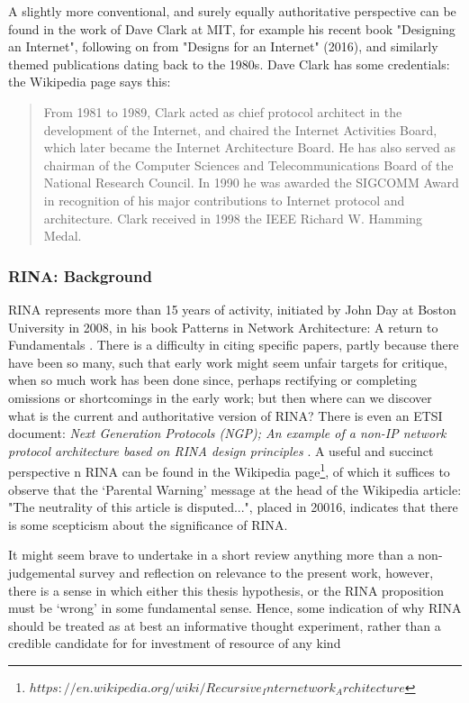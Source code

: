 A slightly more conventional, and surely equally authoritative perspective can be found in the work of Dave Clark at MIT, for example his recent book "Designing an Internet"\cite{clark2023}, following on from "Designs for an Internet" (2016), and similarly themed publications dating back to the 1980s.
Dave Clark has some credentials: the Wikipedia page says this:
\begin{quote}
	From 1981 to 1989, Clark acted as chief protocol architect in the development of the Internet, and chaired the Internet Activities Board, which later became the Internet Architecture Board.
	He has also served as chairman of the Computer Sciences and Telecommunications Board of the National Research Council.
	In 1990 he was awarded the SIGCOMM Award in recognition of his major contributions to Internet protocol and architecture.
	Clark received in 1998 the IEEE Richard W. Hamming Medal.
\end{quote}
\subsubsection{RINA: Background}

RINA represents more than 15 years of activity, initiated by John Day at Boston University in 2008, in his book Patterns in Network Architecture: A return to Fundamentals \cite{rinabook}.  There is a difficulty in citing specific papers, partly because there have been so many, such that early work might seem unfair targets for critique, when so much work has been done since, perhaps rectifying or completing omissions or shortcomings in the early work\cite{day2008}; but then where can we discover what is the current and authoritative version of RINA?  There is even an ETSI document: \textit{Next Generation Protocols (NGP); An example of a non-IP network protocol architecture based on RINA design principles} \cite{etsi-rina}.
A useful and succinct perspective n RINA can be found in the Wikipedia page\footnote{$https://en.wikipedia.org/wiki/Recursive_Internetwork_Architecture$}, of which it suffices to observe that the `Parental Warning' message at the head of the Wikipedia article: "The neutrality of this article is disputed...", placed in 20016, indicates that there is some scepticism about the significance of RINA.

It might seem brave to undertake in a short review anything more than a non-judgemental survey and reflection on relevance to the present work, however, there is a sense in which either this thesis hypothesis, or the RINA proposition must be `wrong' in some fundamental sense.  Hence, some indication of why RINA should be treated as at best an informative thought experiment, rather than a credible candidate for  for investment of resource of any kind

